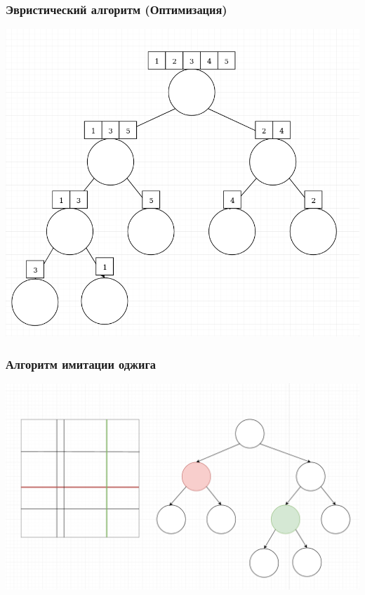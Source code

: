 \documentclass{beamer}
\begin{document}
\begin{frame}
    \frametitle{Эвристический алгоритм (Оптимизация)}
    \begin{center}
    \includegraphics[height=0.8\textheight]{merge.png}
    \end{center}
\end{frame}

\begin{frame}
\frametitle{Алгоритм имитации оджига}
    \begin{center}
    \includegraphics[width=\textwidth]{gena.png}
    \end{center}
\end{frame}
\end{document}
